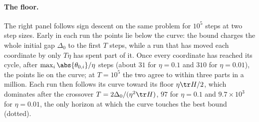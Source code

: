 \begin{refsection}
\begin{figure}[t]
\label{fig:steepest:descent}
\end{figure}

\paragraph{The floor.} The right panel follows sign descent on the same problem for $10^5$ steps at two step sizes. Early in each run the points lie below the curve: the bound charges the whole initial gap $\Delta_0$ to the first $T$ steps, while a run that has moved each coordinate by only $T\eta$ has spent part of it. Once every coordinate has reached its cycle, after $\max_i\abs{\theta_{0,i}}/\eta$ steps (about $31$ for $\eta=0.1$ and $310$ for $\eta=0.01$), the points lie on the curve; at $T=10^5$ the two agree to within three parts in a million. Each run then follows its curve toward its floor $\eta\tr H/2$, which dominates after the crossover $T=2\Delta_0/(\eta^2\tr H)$, $97$ for $\eta=0.1$ and $9.7\times10^3$ for $\eta=0.01$, the only horizon at which the curve touches the best bound (dotted).



\end{refsection}
